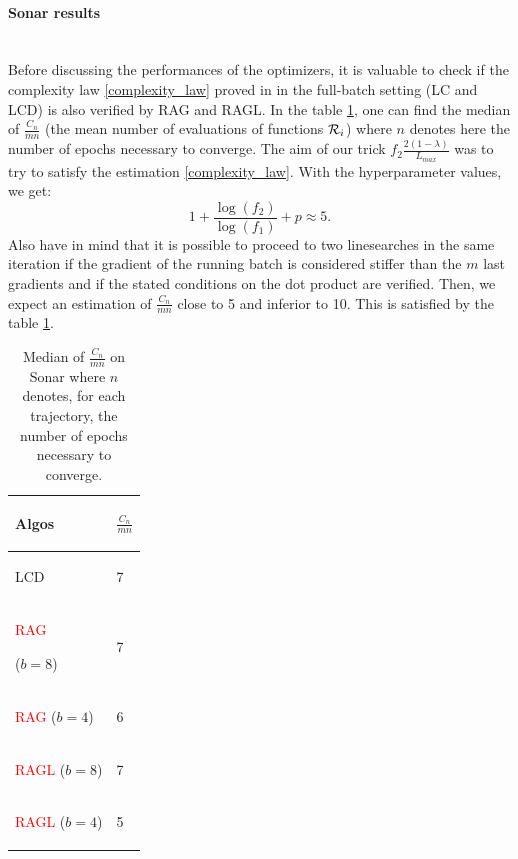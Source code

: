 \paragraph{Sonar results}
~~\\
Before discussing the performances of the optimizers, it is valuable to check if the complexity law \eqref{complexity_law} proved in \cite{Bilel_thesis,Bilel_ICML} in the full-batch setting (LC and LCD) is also verified by RAG and RAGL.
In the table \ref{Sonar_epochs}, one can find the median of $\frac{C_n}{mn}$ (the mean number of evaluations of functions $\mathcal{R}_i$) where $n$ denotes here the number of epochs necessary to converge. The aim of our trick $f_2 \frac{2(1-\lambda)}{L_{max}}$ was to try to satisfy the estimation \eqref{complexity_law}. With the hyperparameter values, we get:
\begin{equation*}
	1+\frac{\log(f_2)}{\log(f_1)}+p \approx 5.
\end{equation*}
Also have in mind that it is possible to proceed to two linesearches in the same iteration if the gradient of the running batch is considered stiffer than the $m$ last gradients and if the stated conditions on the dot product are verified. Then, we expect an estimation of $\frac{C_n}{mn}$ close to 5 and inferior to 10. This is satisfied by the table \ref{Sonar_epochs}. 

\begin{table}[h!]
	\centering
	\caption{Median of $\frac{C_n}{mn}$ on Sonar where $n$ denotes, for each trajectory, the number of epochs necessary to converge.}
	\begin{tabular}{ll}
		\toprule
		\begin{bf} Algos \end{bf} & \begin{bf}$\frac{C_n}{mn}$\end{bf} \\ \midrule
		\begin{bf}LCD\end{bf} & 7 \\ \midrule
		\begin{bf}\textcolor{red}{RAG}\end{bf} ($b=8$) & 7 \\ \midrule
		\begin{bf}\textcolor{red}{RAG} ($b=4$)\end{bf} & 6 \\ \midrule
		\begin{bf}\textcolor{red}{RAGL} ($b=8$)\end{bf} & 7 \\ \midrule
		\begin{bf}\textcolor{red}{RAGL} ($b=4$)\end{bf} & 5 \\ \bottomrule
	\end{tabular}
	\label{Sonar_epochs}
\end{table} 

